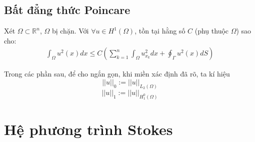 \documentclass[14pt]{extreport}
\begin{document}
\section{Bất đẳng thức Poincare}
Xét $\Omega \subset \mathbb{R}^n$, $\Omega$ bị chặn. Với $\forall  u \in H^1(\Omega)$, tồn tại hằng số $C$ (phụ thuộc $\Omega$) sao cho:
\begin{align*}
\int_{\Omega}u^2(x)dx \leq C\left (  \sum_{k=1}^{n}\int_{\Omega}u_{x_k}^{2}dx+\oint_{\Gamma}u^{2}(x)dS\right )
\end{align*}

Trong các phần sau, để cho ngắn gọn, khi miền xác định đã rõ, ta kí hiệu
$$||u||_0 := ||u||_{L_2(\Omega)}$$
$$||u||_1 := ||u||_{H_1^0(\Omega)}$$

\chapter{Hệ phương trình Stokes}
\end{document}
